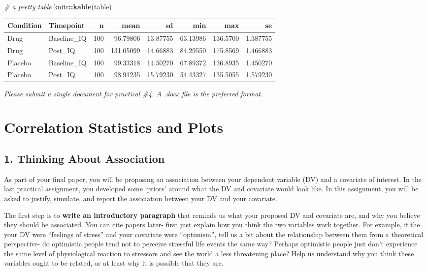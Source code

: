 \documentclass[
]{book}
\newenvironment{Shaded}{\begin{snugshade}}{\end{snugshade}}
\newcommand{\CommentTok}[1]{\textcolor[rgb]{0.56,0.35,0.01}{\textit{#1}}}
\newcommand{\FunctionTok}[1]{\textcolor[rgb]{0.13,0.29,0.53}{\textbf{#1}}}
\newcommand{\NormalTok}[1]{#1}
\newcommand{\SpecialCharTok}[1]{\textcolor[rgb]{0.81,0.36,0.00}{\textbf{#1}}}
\begin{document}
\begin{Shaded}
\begin{Highlighting}[]
\CommentTok{\# a pretty table }
\NormalTok{knitr}\SpecialCharTok{::}\FunctionTok{kable}\NormalTok{(table)}
\end{Highlighting}
\end{Shaded}

\begin{tabular}{l|l|r|r|r|r|r|r}
\hline
Condition & Timepoint & n & mean & sd & min & max & se\\
\hline
Drug & Baseline\_IQ & 100 & 96.79806 & 13.87755 & 63.13986 & 136.5700 & 1.387755\\
\hline
Drug & Post\_IQ & 100 & 131.05099 & 14.66883 & 84.29550 & 175.8569 & 1.466883\\
\hline
Placebo & Baseline\_IQ & 100 & 99.33318 & 14.50270 & 67.89372 & 136.8935 & 1.450270\\
\hline
Placebo & Post\_IQ & 100 & 98.91235 & 15.79230 & 54.43327 & 135.5055 & 1.579230\\
\hline
\end{tabular}

\emph{Please submit a single document for practical \#4. A .docx file is the preferred format.}

\chapter{Correlation Statistics and Plots}\label{correlation-statistics-and-plots}

\section*{1. Thinking About Association}\label{thinking-about-association}

As part of your final paper, you will be proposing an association between your dependent variable (DV) and a covariate of interest. In the last practical assignment, you developed some `priors' around what the DV and covariate would look like. In this assignment, you will be asked to justify, simulate, and report the association between your DV and your covariate.

The first step is to \textbf{write an introductory paragraph} that reminds us what your proposed DV and covariate are, and why you believe they should be associated. You can cite papers later- first just explain how you think the two variables work together. For example, if the your DV were ``feelings of stress'' and your covariate were ``optimism'', tell us a bit about the relationship between them from a theoretical perspective- do optimistic people tend not to perceive stressful life events the same way? Perhaps optimistic people just don't experience the same level of physiological reaction to stressors and see the world a less threatening place? Help us understand why you think these variables ought to be related, or at least why it is possible that they are.
\end{document}
